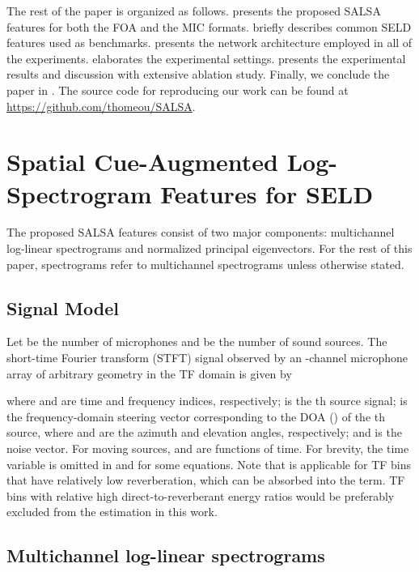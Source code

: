 \documentclass[journal]{IEEEtran}
\begin{document}
The rest of the paper is organized as follows.  presents the proposed SALSA features for both the FOA and the MIC formats.  briefly describes common SELD features used as benchmarks.  presents the network architecture employed in all of the experiments.  elaborates the experimental settings.  presents the experimental results and discussion with extensive ablation study. Finally, we conclude the paper in . The source code for reproducing our work can be found at \href{https://github.com/thomeou/SALSA}{https://github.com/thomeou/SALSA}. \section{Spatial Cue-Augmented Log-Spectrogram Features for SELD}
\label{sec:salsa}

The proposed SALSA features consist of two major components: multichannel log-linear spectrograms and normalized principal eigenvectors. For the rest of this paper, spectrograms refer to multichannel spectrograms unless otherwise stated. 

\subsection{Signal Model}
\label{sec:signal_model}

Let  be the number of microphones and  be the number of sound sources. 
The short-time Fourier transform (STFT) signal observed by an -channel microphone array of arbitrary geometry in the TF domain is given by 

where  and  are time and frequency indices, respectively;  is the th source signal;  is the frequency-domain steering vector corresponding to the DOA () of the th source, where  and  are the azimuth and elevation angles, respectively; and  is the noise vector. For moving sources,  and  are functions of time. For brevity, the time variable is omitted in  and  for some equations. Note that  is applicable for TF bins that have relatively low reverberation, which can be absorbed into the  term. TF bins with relative high direct-to-reverberant energy ratios would be preferably excluded from the estimation in this work. 

\subsection{Multichannel log-linear spectrograms}
\end{document}
